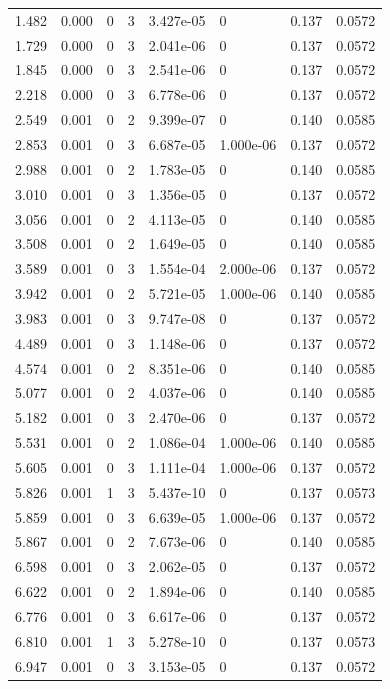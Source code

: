 \documentclass[preview]{standalone}
\begin{document}
{{\begin{tabular}{L{1.2cm}C{1.2cm} C{0.3cm}C{0.5cm} C{1.4cm}C{1.4cm} C{1.4cm}C{1.4cm}}
  1.482  &  0.000  & 0     &  3 &  3.427e-05  & 0  & 0.137 &  0.0572   \\ 
  1.729  &  0.000  & 0     &  3 &  2.041e-06  & 0  & 0.137 &  0.0572   \\ 
  1.845  &  0.000  & 0     &  3 &  2.541e-06  & 0  & 0.137 &  0.0572   \\ 
  2.218  &  0.000  & 0     &  3 &  6.778e-06  & 0  & 0.137 &  0.0572   \\ 
  2.549  &  0.001  & 0     &  2 &  9.399e-07  & 0  & 0.140 &  0.0585   \\ 
  2.853  &  0.001  & 0     &  3 &  6.687e-05  & 1.000e-06  & 0.137 &  0.0572   \\ 
  2.988  &  0.001  & 0     &  2 &  1.783e-05  & 0  & 0.140 &  0.0585   \\ 
  3.010  &  0.001  & 0     &  3 &  1.356e-05  & 0  & 0.137 &  0.0572   \\ 
  3.056  &  0.001  & 0     &  2 &  4.113e-05  & 0  & 0.140 &  0.0585   \\ 
  3.508  &  0.001  & 0     &  2 &  1.649e-05  & 0  & 0.140 &  0.0585   \\ 
  3.589  &  0.001  & 0     &  3 &  1.554e-04  & 2.000e-06  & 0.137 &  0.0572   \\ 
  3.942  &  0.001  & 0     &  2 &  5.721e-05  & 1.000e-06  & 0.140 &  0.0585   \\ 
  3.983  &  0.001  & 0     &  3 &  9.747e-08  & 0  & 0.137 &  0.0572   \\ 
  4.489  &  0.001  & 0     &  3 &  1.148e-06  & 0  & 0.137 &  0.0572   \\ 
  4.574  &  0.001  & 0     &  2 &  8.351e-06  & 0  & 0.140 &  0.0585   \\ 
  5.077  &  0.001  & 0     &  2 &  4.037e-06  & 0  & 0.140 &  0.0585   \\ 
  5.182  &  0.001  & 0     &  3 &  2.470e-06  & 0  & 0.137 &  0.0572   \\ 
  5.531  &  0.001  & 0     &  2 &  1.086e-04  & 1.000e-06  & 0.140 &  0.0585   \\ 
  5.605  &  0.001  & 0     &  3 &  1.111e-04  & 1.000e-06  & 0.137 &  0.0572   \\ 
  5.826  &  0.001  & 1     &  3 &  5.437e-10  & 0  & 0.137 &  0.0573   \\ 
  5.859  &  0.001  & 0     &  3 &  6.639e-05  & 1.000e-06  & 0.137 &  0.0572   \\ 
  5.867  &  0.001  & 0     &  2 &  7.673e-06  & 0  & 0.140 &  0.0585   \\ 
  6.598  &  0.001  & 0     &  3 &  2.062e-05  & 0  & 0.137 &  0.0572   \\ 
  6.622  &  0.001  & 0     &  2 &  1.894e-06  & 0  & 0.140 &  0.0585   \\ 
  6.776  &  0.001  & 0     &  3 &  6.617e-06  & 0  & 0.137 &  0.0572   \\ 
  6.810  &  0.001  & 1     &  3 &  5.278e-10  & 0  & 0.137 &  0.0573   \\ 
  6.947  &  0.001  & 0     &  3 &  3.153e-05  & 0  & 0.137 &  0.0572   \\ 
\hline 
\end{tabular} 

}}
\end{document}
